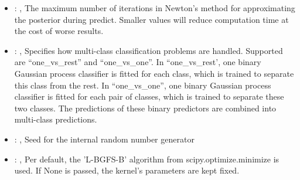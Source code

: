 \begin{itemize}
    \item {}: ,
      The maximum number of iterations in Newton’s method for approximating the posterior during
      predict. Smaller values will reduce computation time at
      the cost of worse results.

    \item {}: ,
      Specifies how multi-class classification problems are handled. Supported are ``one\_vs\_rest''
      and ``one\_vs\_one''.                                                         In
      ``one\_vs\_rest', one binary Gaussian process classifier is fitted for each class, which is
      trained to separate this class                                                         from
      the rest. In ``one\_vs\_one'', one binary Gaussian process classifier is fitted for each pair
      of classes, which is trained to
      separate these two classes. The predictions of these binary predictors are combined into
      multi-class predictions.

    \item {}: ,
      Seed for the internal random number generator

    \item {}: ,
      Per default, the 'L-BGFS-B' algorithm from
      scipy.optimize.minimize is used. If None is passed, the kernel’s
      parameters are kept fixed.
  \end{itemize}


